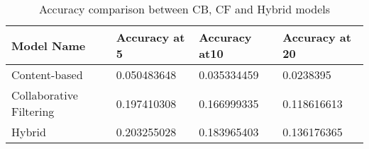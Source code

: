 \vspace{-0.5em}

\begin{table}[H]
\centering
\begin{tabular}{|l|l|l|l|}
\hline
\rowcolor[HTML]{C0C0C0} 
{\color[HTML]{000000} \textbf{Model Name}}     & {\color[HTML]{000000} \textbf{Accuracy at 5}} & {\color[HTML]{000000} \textbf{Accuracy at10}} & {\color[HTML]{000000} \textbf{Accuracy at 20}} \\ \hline
{\color[HTML]{000000} Content-based}           & {\color[HTML]{000000} 0.050483648}            & {\color[HTML]{000000} 0.035334459}            & {\color[HTML]{000000} 0.0238395}               \\ \hline
{\color[HTML]{000000} Collaborative Filtering} & {\color[HTML]{000000} 0.197410308}            & {\color[HTML]{000000} 0.166999335}            & {\color[HTML]{000000} 0.118616613}             \\ \hline
{\color[HTML]{000000} Hybrid}                  & {\color[HTML]{000000} 0.203255028}            & {\color[HTML]{000000} 0.183965403}            & {\color[HTML]{000000} 0.136176365}             \\ \hline
\end{tabular}
\caption{Accuracy comparison between CB, CF and Hybrid models}
\label{tb:accuracy}
\end{table}
